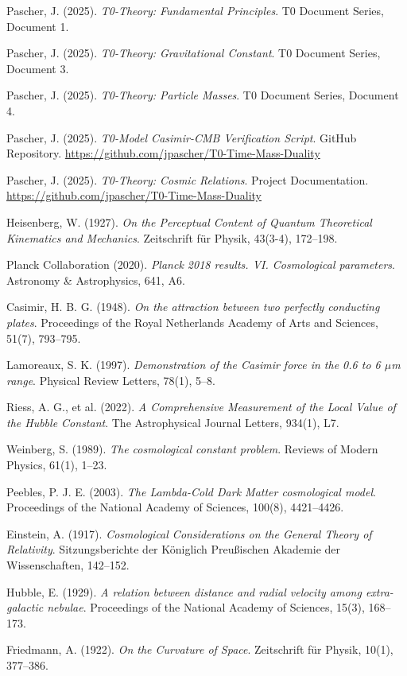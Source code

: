 \documentclass[12pt,a4paper]{article}
\begin{document}
	\begin{thebibliography}{30}
		
		Pascher, J. (2025). 
		\textit{T0-Theory: Fundamental Principles}. 
		T0 Document Series, Document 1.
		
		Pascher, J. (2025). 
		\textit{T0-Theory: Gravitational Constant}. 
		T0 Document Series, Document 3.
		
		Pascher, J. (2025). 
		\textit{T0-Theory: Particle Masses}. 
		T0 Document Series, Document 4.
		
		Pascher, J. (2025). 
		\textit{T0-Model Casimir-CMB Verification Script}. 
		GitHub Repository. 
		\url{https://github.com/jpascher/T0-Time-Mass-Duality}
		
		Pascher, J. (2025). 
		\textit{T0-Theory: Cosmic Relations}. 
		Project Documentation. 
		\url{https://github.com/jpascher/T0-Time-Mass-Duality}
		
		Heisenberg, W. (1927). 
		\textit{On the Perceptual Content of Quantum Theoretical Kinematics and Mechanics}. 
		Zeitschrift für Physik, 43(3-4), 172--198.
		
		Planck Collaboration (2020). 
		\textit{Planck 2018 results. VI. Cosmological parameters}. 
		Astronomy \& Astrophysics, 641, A6.
		
		Casimir, H. B. G. (1948). 
		\textit{On the attraction between two perfectly conducting plates}. 
		Proceedings of the Royal Netherlands Academy of Arts and Sciences, 51(7), 793--795.
		
		Lamoreaux, S. K. (1997). 
		\textit{Demonstration of the Casimir force in the 0.6 to 6 $\mu$m range}. 
		Physical Review Letters, 78(1), 5--8.
		
		Riess, A. G., et al. (2022). 
		\textit{A Comprehensive Measurement of the Local Value of the Hubble Constant}. 
		The Astrophysical Journal Letters, 934(1), L7.
		
		Weinberg, S. (1989). 
		\textit{The cosmological constant problem}. 
		Reviews of Modern Physics, 61(1), 1--23.
		
		Peebles, P. J. E. (2003). 
		\textit{The Lambda-Cold Dark Matter cosmological model}. 
		Proceedings of the National Academy of Sciences, 100(8), 4421--4426.
		
		Einstein, A. (1917). 
		\textit{Cosmological Considerations on the General Theory of Relativity}. 
		Sitzungsberichte der Königlich Preußischen Akademie der Wissenschaften, 142--152.
		
		Hubble, E. (1929). 
		\textit{A relation between distance and radial velocity among extra-galactic nebulae}. 
		Proceedings of the National Academy of Sciences, 15(3), 168--173.
		
		Friedmann, A. (1922). 
		\textit{On the Curvature of Space}. 
		Zeitschrift für Physik, 10(1), 377--386.
		
	\end{thebibliography}
	
\end{document}
